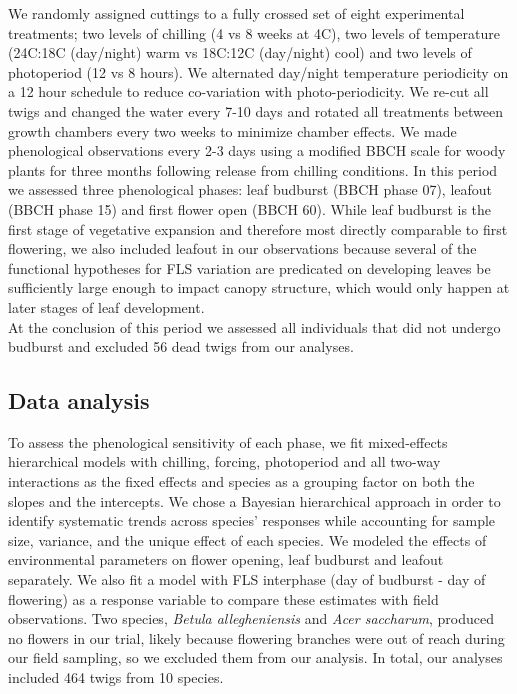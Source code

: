 \documentclass[12pt]{article}\usepackage[]{graphicx}\usepackage[]{color}
\begin{document}
\noindent We randomly assigned cuttings to a fully crossed set of eight experimental treatments; two levels of chilling (4 vs 8 weeks at 4\degree C), two levels of temperature (24\degree C:18\degree C (day/night) warm vs 18\degree C:12\degree C (day/night) cool) and two levels of photoperiod (12 vs 8 hours). We alternated day/night temperature periodicity on a 12 hour schedule to reduce co-variation with photo-periodicity. We re-cut all twigs and changed the water every 7-10 days and rotated all treatments between growth chambers every two weeks to minimize chamber effects. We made phenological observations every 2-3 days using a modified BBCH scale for woody plants \citep{Finn2007} for three months following release from chilling conditions. In this period we assessed three phenological phases: leaf budburst (BBCH phase 07), leafout (BBCH phase 15) and first flower open (BBCH 60). While leaf budburst is the first stage of vegetative expansion and therefore most directly comparable to first flowering, we also included leafout in our observations because several of the functional hypotheses for FLS variation are predicated on developing leaves be sufficiently large enough to impact canopy structure, which would only happen at later stages of leaf development.\\ 

\noindent At the conclusion of this period we assessed all individuals that did not undergo budburst and excluded 56 dead twigs from our analyses. 

\subsection*{Data analysis}

\noindent To assess the phenological sensitivity of each phase, we fit mixed-effects hierarchical models with chilling, forcing, photoperiod and all two-way interactions as the fixed effects and species as a grouping factor on both the slopes and the intercepts. We chose a Bayesian hierarchical approach in order to identify systematic trends across species' responses while accounting for sample size, variance, and the unique effect of each species. %
We modeled the effects of environmental parameters on flower opening, leaf budburst and leafout separately. We also fit a model with FLS interphase (day of budburst - day of flowering) as a response variable to compare these estimates with field observations. Two species, \textit{Betula allegheniensis} and \textit{Acer saccharum}, produced no flowers in our trial, likely because flowering branches were out of reach during our field sampling, so we excluded them from our analysis. In total, our analyses included 464 twigs from 10 species. \\ 
\end{document}
